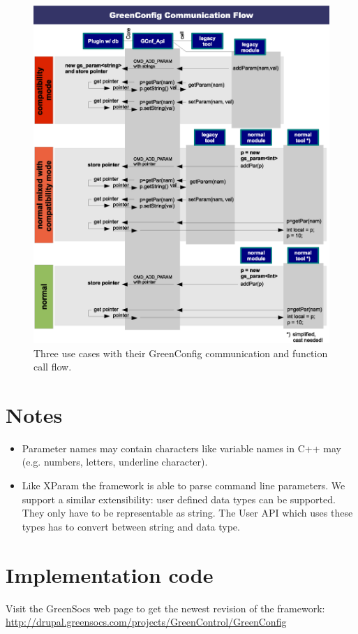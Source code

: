 \begin{figure}%
	\centerline{
		\includegraphics[width=\textwidth]{GreenConfig_Communication_Flow_normal.eps}}
	\caption{Three use cases with their GreenConfig communication and function call flow.}
	\label{fig:GCnfCommFlow}
\end{figure}


\section{Notes}
\begin{itemize}
	\item Parameter names may contain characters like variable names in C++ may (e.g. numbers, letters, underline character).
	\item Like XParam the \GreenConfig framework is able to parse command line parameters. We support a similar extensibility: user defined data types can be supported. They only have to be representable as string. The User API which uses these types has to convert between string and data type.
\end{itemize}


\section{Implementation code}
Visit the GreenSocs web page to get the newest revision of the \GreenConfig framework:\\
\href{http://drupal.greensocs.com/projects/GreenControl/GreenConfig}{http://drupal.greensocs.com/projects/GreenControl/GreenConfig}
